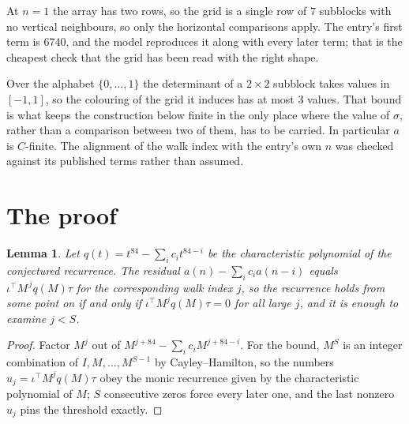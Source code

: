 \documentclass[11pt,a4paper]{article}
\theoremstyle{plain}
\newtheorem{lemma}[theorem]{Lemma}
\theoremstyle{definition}
\begin{document}
At $n=1$ the array has two rows, so the grid is a single row of $7$
subblocks with no vertical neighbours, so only the horizontal comparisons apply. The
entry's first term is $6740$, and the model reproduces it along with every later term; that
is the cheapest check that the grid has been read with the right shape.

Over the alphabet $\{0,\dots,1\}$ the determinant of a $2\times2$ subblock takes values in
$[-1,1]$, so the colouring of the grid it induces has at most $3$ values.
That bound is what keeps the construction below finite in the only place where the value of
$\sigma$, rather than a comparison between two of them, has to be carried.
In particular $a$ is $C$-finite. The alignment of the walk index with the entry's own $n$ was
checked against its published terms rather than assumed.

\section{The proof}

\begin{lemma}\label{lem:crit}
Let $q(t)=t^{84}-\sum_i c_it^{84-i}$ be the characteristic polynomial of the
conjectured recurrence. The residual $a(n)-\sum_ic_ia(n-i)$ equals
$\iota^{\!\top}M^{\,j}q(M)\tau$ for the corresponding walk index $j$, so the recurrence
holds from some point on if and only if $\iota^{\!\top}M^{j}q(M)\tau=0$ for all large $j$,
and it is enough to examine $j<S$.
\end{lemma}

\begin{proof}
Factor $M^{j}$ out of $M^{j+84}-\sum_ic_iM^{j+84-i}$. For the bound, $M^{S}$
is an integer combination of $I,M,\dots,M^{S-1}$ by Cayley--Hamilton, so the numbers
$u_j=\iota^{\!\top}M^{j}q(M)\tau$ obey the monic recurrence given by the characteristic
polynomial of $M$; $S$ consecutive zeros force every later one, and the last nonzero $u_j$
pins the threshold exactly.
\end{proof}
\end{document}
